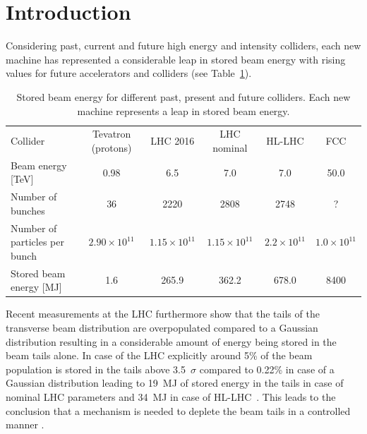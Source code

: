 \documentclass[%
 reprint,
 amsmath,amssymb,
 aps,
prstab,
]{revtex4-1}
\begin{document}

\maketitle


\section{Introduction\label{sec:intro}}%
Considering past, current and future high energy and intensity colliders, each new machine has represented a considerable leap in stored beam energy with rising values for future accelerators and colliders (see Table~\ref{tab:stored_energy}). 
\begin{table}
	\caption{\label{tab:stored_energy}%
		Stored beam energy for different past, present and future colliders. Each new machine represents a leap in stored beam energy.
	}
	\begin{ruledtabular}
		\begin{tabular}{lccccc}
			Collider& Tevatron (protons) \cite{tevatron} & LHC 2016 \cite{chamonix2017param}
			& LHC nominal \cite{lhc_design} & HL-LHC \cite{hlcdr} & FCC \cite{fcc_param_2017} \\
			\colrule
			Beam energy [TeV] & 0.98 & 6.5 & 7.0 & 7.0 & 50.0\\
			Number of bunches & 36 & 2220 & 2808 & 2748 & ? \\
			Number of particles per bunch & $2.90\times 10^{11}$ & $1.15\times 10^{11}$ & $1.15\times 10^{11}$ & $2.2\times 10^{11}$ & $1.0\times 10^{11}$\\
			Stored beam energy [MJ] & 1.6 & 265.9 & 362.2 & 678.0 & 8400 \\
		\end{tabular}
	\end{ruledtabular}
\end{table}
Recent measurements at the LHC furthermore show that the tails of the transverse beam distribution are overpopulated compared to a Gaussian distribution resulting in a considerable amount of energy being stored in the beam tails alone. In case of the LHC explicitly around 5\% of the beam population is stored in the tails above 3.5~$\sigma$ compared to 0.22\% in case of a Gaussian distribution leading to 19~MJ of stored energy in the tails in case of nominal LHC parameters and 34~MJ in case of HL-LHC~\cite{helreview_valentino}. This leads to the conclusion that a mechanism is needed to deplete the beam tails in a controlled manner \cite{helreview}.
\end{document}
